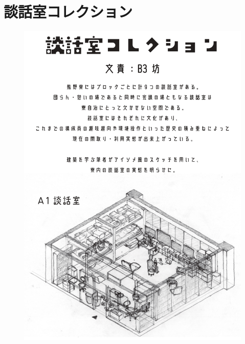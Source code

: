 \section{談話室コレクション}\label{sec:談話室コレクション}

\begin{figure}[bh]
\vspace{10mm}
\centering
\includegraphics[]{gazo/談話室sketch_page-0001.jpg}
\end{figure}

